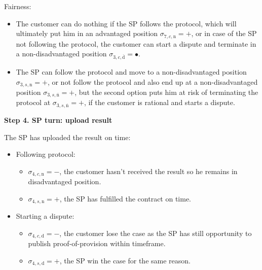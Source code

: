 \documentclass{ieeeaccess}
\begin{document}
Fairness:

\begin{itemize}

\item
  The customer can do nothing if the SP follows the protocol, which will
  ultimately put him in an advantaged position
  \(\sigma_{7, c, \mathrm{n}} = +\), or in case of the SP not following
  the protocol, the customer can start a dispute and terminate in a
  non-disadvantaged position
  \(\sigma_{3, c, \overline{\mathrm{d}}} = •\).
\item
  The SP can follow the protocol and move to a non-disadvantaged
  position \(\sigma_{3, s, \mathrm{n}} = +\), or not follow the protocol
  and also end up at a non-disadvantaged position
  \(\sigma_{3, s, \overline{\mathrm{n}}} = +\), but the second option
  puts him at risk of terminating the protocol at
  \(\sigma_{3, s, \overline{\mathrm{n}}} = +\), if the customer is
  rational and starts a dispute.
\end{itemize}

\noindent \textbf
{Step 4. SP turn: upload result}\label{step-4-publication-of-results}

The SP has uploaded the result on time:

\begin{itemize}
\item
  Following protocol:

  \begin{itemize}
  
  \item
    \(\sigma_{4, c, \mathrm{n}} = -\), the customer hasn't received the result so he remains in disadvantaged position.
  \item
    \(\sigma_{4, s, \mathrm{n}} = +\), the SP has fulfilled the contract on time.
  \end{itemize}
\item
  Starting a dispute:

  \begin{itemize}
  
  \item
    \(\sigma_{4, c, \mathrm{d}} = -\), the customer lose the case as the
    SP has still opportunity to publish proof-of-provision within
    timeframe.
  \item
    \(\sigma_{4, s, \mathrm{d}} = +\), the SP win the case for the same
    reason.
  \end{itemize}
\end{itemize}
\end{document}
